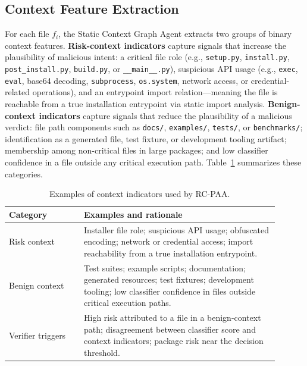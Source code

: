 \documentclass[conference,a4paper]{IEEEtran}
\newcommand{\rcpaa}{RC-PAA}
\begin{document}
\subsection{Context Feature Extraction}
For each file $f_i$, the Static Context Graph Agent extracts two groups of binary
context features. \textbf{Risk-context indicators} capture signals that increase the
plausibility of malicious intent: a critical file role (e.g., \texttt{setup.py},
\texttt{install.py}, \texttt{post\_install.py}, \texttt{build.py}, or
\texttt{\_\_main\_\_.py}), suspicious API usage (e.g., \texttt{exec},
\texttt{eval}, base64 decoding, \texttt{subprocess}, \texttt{os.system}, network
access, or credential-related operations), and an entrypoint import relation---meaning
the file is reachable from a true installation entrypoint via static import analysis.
\textbf{Benign-context indicators} capture signals that reduce the plausibility of a
malicious verdict: file path components such as \texttt{docs/}, \texttt{examples/},
\texttt{tests/}, or \texttt{benchmarks/}; identification as a generated file, test
fixture, or development tooling artifact; membership among non-critical files in
large packages; and low classifier confidence in a file outside any critical execution
path. Table~\ref{tab:features} summarizes these categories.

\begin{table}[t]
\centering
\caption{Examples of context indicators used by \rcpaa{}.}
\label{tab:features}
\scriptsize
\begin{tabular}{p{0.25\linewidth}p{0.65\linewidth}}
\toprule
Category & Examples and rationale \\
\midrule
Risk context    & Installer file role; suspicious API usage; obfuscated encoding;
                  network or credential access; import reachability from a true
                  installation entrypoint. \\
Benign context  & Test suites; example scripts; documentation; generated resources;
                  test fixtures; development tooling; low classifier confidence in
                  files outside critical execution paths. \\
Verifier triggers & High risk attributed to a file in a benign-context path;
                  disagreement between classifier score and context indicators;
                  package risk near the decision threshold. \\
\bottomrule
\end{tabular}
\end{table}
\end{document}
